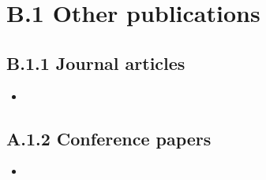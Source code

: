 \section*{B.1 Other publications}


\subsection*{B.1.1 Journal articles}
\begin{itemize}
\item {}
\end{itemize}

\subsection*{A.1.2 Conference papers}
\begin{itemize}
\item {}\end{itemize}

